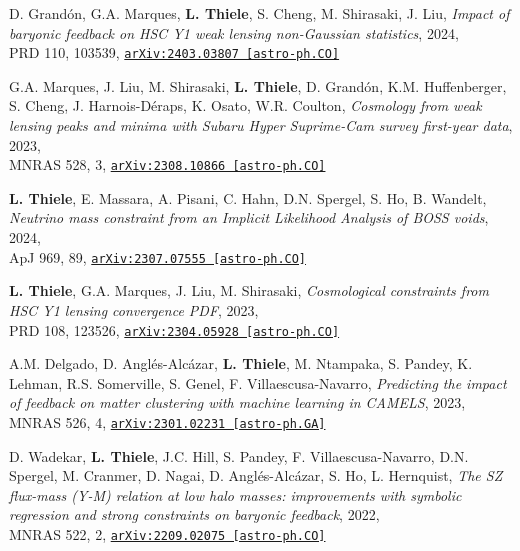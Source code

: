 \begin{minipage}{\textwidth}
D. Grand\'on, G.A. Marques, {\bf L. Thiele}, S. Cheng, M. Shirasaki, J. Liu,
\emph{Impact of baryonic feedback on HSC Y1 weak lensing non-Gaussian statistics}, 2024,\\
PRD 110, 103539,
\href{https://arxiv.org/abs/2403.03807}{\mbox{\texttt{arXiv:2403.03807 [astro-ph.CO]}}}
\end{minipage}

\begin{minipage}{\textwidth}
G.A. Marques, J. Liu, M. Shirasaki, {\bf L. Thiele}, D. Grand\'on, K.M. Huffenberger, S. Cheng, J. Harnois-D\'eraps, K. Osato, W.R. Coulton,
\emph{Cosmology from weak lensing peaks and minima with Subaru Hyper Suprime-Cam survey first-year data}, 2023,\\
MNRAS 528, 3,
\href{https://arxiv.org/abs/2308.10866}{\mbox{\texttt{arXiv:2308.10866 [astro-ph.CO]}}}
\end{minipage}

\begin{minipage}{\textwidth}
{\bf L. Thiele}, E. Massara, A. Pisani, C. Hahn, D.N. Spergel, S. Ho, B. Wandelt,
\emph{Neutrino mass constraint from an Implicit Likelihood Analysis of BOSS voids}, 2024,\\
ApJ 969, 89,
\href{https://arxiv.org/abs/2307.07555}{\mbox{\texttt{arXiv:2307.07555 [astro-ph.CO]}}}
\end{minipage}

\begin{minipage}{\textwidth}
{\bf L. Thiele}, G.A. Marques, J. Liu, M. Shirasaki,
\emph{Cosmological constraints from HSC Y1 lensing convergence PDF}, 2023,\\
PRD 108, 123526,
\href{https://arxiv.org/abs/2304.05928}{\mbox{\texttt{arXiv:2304.05928 [astro-ph.CO]}}}
\end{minipage}

\begin{minipage}{\textwidth}
A.M. Delgado, D. Angl\'es-Alc\'azar, {\bf L. Thiele}, M. Ntampaka, S. Pandey, K. Lehman, R.S. Somerville, S. Genel, F. Villaescusa-Navarro,
\emph{Predicting the impact of feedback on matter clustering with machine learning in CAMELS}, 2023,\\
MNRAS 526, 4,
\href{https://arxiv.org/abs/2301.02231}{\mbox{\texttt{arXiv:2301.02231 [astro-ph.GA]}}}
\end{minipage}

\begin{minipage}{\textwidth}
D. Wadekar, {\bf L. Thiele}, J.C. Hill, S. Pandey, F. Villaescusa-Navarro, D.N. Spergel, M. Cranmer, D. Nagai, D. Angl\'es-Alc\'azar, S. Ho, L. Hernquist,
\emph{The SZ flux-mass (Y-M) relation at low halo masses: improvements with symbolic regression and strong constraints on baryonic feedback}, 2022,\\
MNRAS 522, 2,
\href{https://arxiv.org/abs/2209.02075}{\mbox{\texttt{arXiv:2209.02075 [astro-ph.CO]}}}
\end{minipage}

